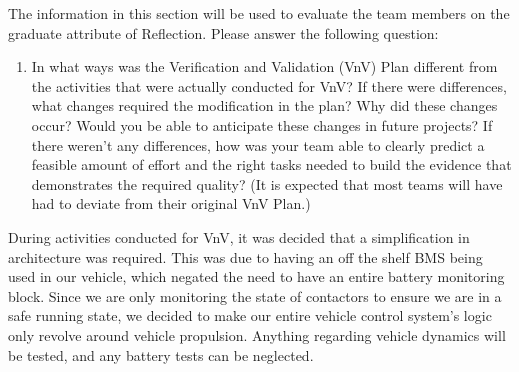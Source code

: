 \documentclass[12pt, titlepage]{article}
\begin{document}
The information in this section will be used to evaluate the team members on the
graduate attribute of Reflection.  Please answer the following question:

\begin{enumerate}
  \item In what ways was the Verification and Validation (VnV) Plan different
  from the activities that were actually conducted for VnV?  If there were
  differences, what changes required the modification in the plan?  Why did
  these changes occur?  Would you be able to anticipate these changes in future
  projects?  If there weren't any differences, how was your team able to clearly
  predict a feasible amount of effort and the right tasks needed to build the
  evidence that demonstrates the required quality?  (It is expected that most
  teams will have had to deviate from their original VnV Plan.)
\end{enumerate}


During activities conducted for VnV, it was decided that a simplification in architecture was required.
This was due to having an off the shelf BMS being used in our vehicle, which negated the need to have an
entire battery monitoring block. Since we are only monitoring the state of contactors to ensure we are in a 
safe running state, we decided to make our entire vehicle control system's logic only revolve around vehicle
propulsion. Anything regarding vehicle dynamics will be tested, and any battery tests can be neglected.
\end{document}

